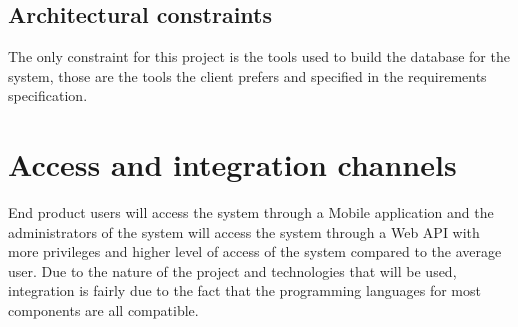 \documentclass[11pt,titlepage]{article} %
\begin{document}
\subsection{Architectural constraints}
The only constraint for this project is the tools used to build the database for the system, those are the tools the client prefers and specified in the requirements specification.




\section{Access and integration channels}
End product users will access the system through a Mobile application and the administrators of the system will access the system through a Web API with more privileges and higher level of access of the system compared to the average user. Due to the nature of the project and technologies that will be used, integration is fairly due to the fact that the programming languages for most components are all compatible.
\end{document}

